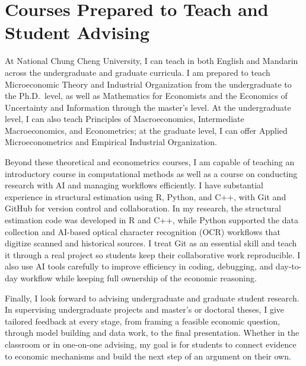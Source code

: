 \documentclass[11pt]{article}
\begin{document}
\section*{Courses Prepared to Teach and Student Advising}

At National Chung Cheng University, I can teach in both English and Mandarin across the undergraduate and graduate curricula. I am prepared to teach Microeconomic Theory and Industrial Organization from the undergraduate to the Ph.D.\ level, as well as Mathematics for Economists and the Economics of Uncertainty and Information through the master's level. At the undergraduate level, I can also teach Principles of Macroeconomics, Intermediate Macroeconomics, and Econometrics; at the graduate level, I can offer Applied Microeconometrics and Empirical Industrial Organization.

Beyond these theoretical and econometrics courses, I am capable of teaching an introductory course in computational methods as well as a course on conducting research with AI and managing workflows efficiently. I have substantial experience in structural estimation using R, Python, and C++, with Git and GitHub for version control and collaboration. In my research, the structural estimation code was developed in R and C++, while Python supported the data collection and AI-based optical character recognition (OCR) workflows that digitize scanned and historical sources. I treat Git as an essential skill and teach it through a real project so students keep their collaborative work reproducible. I also use AI tools carefully to improve efficiency in coding, debugging, and day-to-day workflow while keeping full ownership of the economic reasoning.

Finally, I look forward to advising undergraduate and graduate student research. In supervising undergraduate projects and master's or doctoral theses, I give tailored feedback at every stage, from framing a feasible economic question, through model building and data work, to the final presentation. Whether in the classroom or in one-on-one advising, my goal is for students to connect evidence to economic mechanisms and build the next step of an argument on their own.
\end{document}
